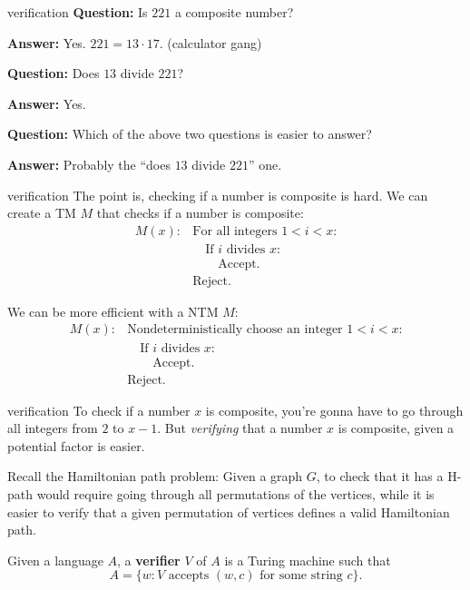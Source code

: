 \documentclass{beamer}
\begin{document}
\begin{frame}{verification}
\textbf{Question:} Is $221$ a composite number?

\textbf{Answer:} Yes. $221 = 13 \cdot 17$. (calculator gang)

\vspace{2mm}

\pause

\textbf{Question:} Does $13$ divide $221$?

\textbf{Answer:} Yes.

\vspace{2mm}

\pause

\textbf{Question:} Which of the above two questions is easier to answer?

\textbf{Answer:} Probably the ``does $13$ divide $221$'' one.



\end{frame}

\begin{frame}{verification}
The point is, checking if a number is composite is hard. We can create a TM $M$ that checks if a number is composite:
\begin{align*}
M(x): &\text{For all integers $1 < i < x$:}\\
&\quad \text{If $i$ divides $x$:}\\
&\quad \quad \text{Accept.}\\
&\text{Reject.}
\end{align*}

We can be more efficient with a NTM $M$:
\begin{align*}
M(x): &\text{Nondeterministically choose an integer $1 < i < x$:}\\
&\quad \text{If $i$ divides $x$:}\\
&\quad \quad \text{Accept.}\\
&\text{Reject.}
\end{align*}

\end{frame}

\begin{frame}{verification}
To check if a number $x$ is composite, you're gonna have to go through all integers from $2$ to $x - 1$. But \textit{verifying} that a number $x$ is composite, given a potential factor is easier.

\pause

\vspace{2mm}

Recall the Hamiltonian path problem: Given a graph $G$, to check that it has a H-path would require going through all permutations of the vertices, while it is easier to verify that a given permutation of vertices defines a valid Hamiltonian path.

\pause

\vspace{2mm}

Given a language $A$, a \textbf{verifier} $V$ of $A$ is a Turing machine such that
$$A = \{w: \text{$V$ accepts $(w, c)$ for some string $c$}\}.$$

\end{frame}
\end{document}
